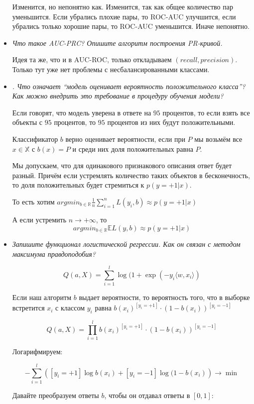 \documentclass[12pt]{article}
\begin{document}
\begin{itemize}
Изменится, но непонятно как. Изменится, так как общее количество пар уменьшится. Если убрались плохие пары, то ROC-AUC улучшится, если убрались только хорошие пары, то ROC-AUC уменьшится. Иначе непонятно.

\item \textit{Что такое AUC-PRC? Опишите алгоритм построения PR-кривой.}

Идея та же, что и в AUC-ROC, только откладываем $(recall, precision)$. Только тут уже нет проблемы с несбалансированными классами.

\item \textit{. Что означает “модель оценивает вероятность положительного класса”? Как можно
внедрить это требование в процедуру обучения модели?}

Если говорят, что модель уверена в ответе на $95$ процентов, то если взять все объекты с $95$ процентов, то $95$ процентов из них будут положительными.

Классификатор $b$ верно оценивает вероятности, если при $P$ мы возьмём все $x \in \mathbb{X}$ с $b(x) = P$ и среди них доля положительных равна $P$.

Мы допускаем, что для одинакового признакового описания ответ будет разный. Причём если устремлять количество таких объектов в бесконечность, то доля положительных будет стремиться к $p(y=+1|x)$.

То есть хотим $argmin_{b \in \mathbb{R}} \frac{1}{n} \sum_{i=1}^n L(y_i, b) \approx p(y=+1|x)$

А если устремить $n \rightarrow +\infty$, то 
\[ argmin_{b \in \mathbb{R}} \mathbb{E} L(y, b) \approx p(y=+1|x) \]

\item \textit{Запишите функционал логистической регрессии. Как он связан с методом максимума
правдоподобия?}

\[ Q(a, X) =  \sum_{i=1}^l \log (1+\exp(-y_i \langle w, x_i \rangle )\]

Если наш алгоритм $b$ выдает вероятности, то вероятность того, что в выборке встретится $x_i$ с классом $y_i$ равна $b(x_i)^{[y_i = +1]}\cdot (1-b(x_i))^{[y_i=-1]}$

\[ Q(a, X) = \prod_{i=1}^l b(x_i)^{[y_i = +1]}\cdot (1-b(x_i))^{[y_i=-1]} \]

Логарифмируем:

\[ - \sum_{i=1}^l \left( [y_i = +1] \log b(x_i) + [y_i = -1] \log (1-b(x_i) \right) \rightarrow \min \]

Давайте преобразуем ответы $b$, чтобы он отдавал ответы в $[0,1]$:


\end{itemize}
\end{document}
